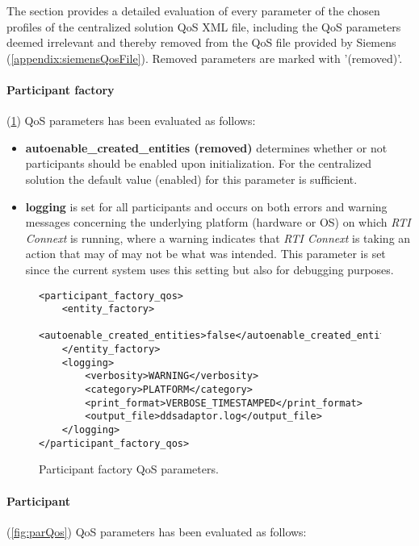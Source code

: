 The section provides a detailed evaluation of every parameter of the chosen profiles of the centralized solution QoS XML file, including the QoS parameters deemed irrelevant and thereby removed from the QoS file provided by Siemens (\cref{appendix:siemensQosFile}). Removed parameters are marked with '(removed)'.

\paragraph{Participant factory} (\cref{fig:parFacQos}) QoS parameters has been evaluated as follows:

\begin{itemize}
	\item \textbf{autoenable\_created\_entities (removed)} determines whether or not participants should be enabled upon initialization. For the centralized solution the default value (enabled) for this parameter is sufficient.
	\item \textbf{logging} is set for all participants and occurs on both errors and warning messages concerning the underlying platform (hardware or OS) on which \textit{RTI Connext} is running, where a warning indicates that \textit{RTI Connext} is taking an action that may of may not be what was intended. This parameter is set since the current system uses this setting but also for debugging purposes.
\end{itemize}
\lstset{tabsize=2, language=XML, basicstyle=\small}

\begin{figure}
\begin{lstlisting}
<participant_factory_qos>
	<entity_factory>
		<autoenable_created_entities>false</autoenable_created_entities>
	</entity_factory>
	<logging>
		<verbosity>WARNING</verbosity>
		<category>PLATFORM</category>
		<print_format>VERBOSE_TIMESTAMPED</print_format>
		<output_file>ddsadaptor.log</output_file>
	</logging>
</participant_factory_qos>
\end{lstlisting}
\caption[Participant factory QoS parameters]{
		\label{fig:parFacQos} 
		\footnotesize{Participant factory QoS parameters.}
	}
\end{figure}

\paragraph{Participant} (\cref{fig:parQos}) QoS parameters has been evaluated as follows:
 
